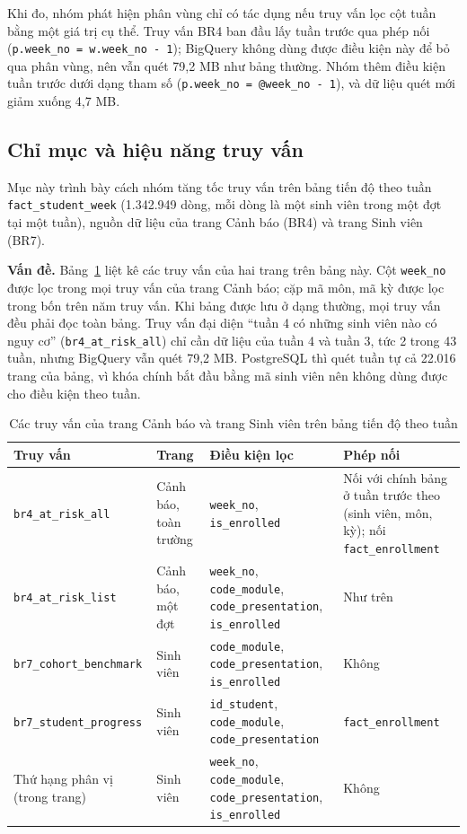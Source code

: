 Khi đo, nhóm phát hiện phân vùng chỉ có tác dụng nếu truy vấn lọc cột tuần bằng một giá trị cụ
thể. Truy vấn BR4 ban đầu lấy tuần trước qua phép nối (\texttt{p.week\_no = w.week\_no - 1});
BigQuery không dùng được điều kiện này để bỏ qua phân vùng, nên vẫn quét 79,2 MB như bảng thường.
Nhóm thêm điều kiện tuần trước dưới dạng tham số (\texttt{p.week\_no = @week\_no - 1}), và dữ liệu
quét mới giảm xuống 4,7 MB.

\subsection{Chỉ mục và hiệu năng truy vấn}
\label{sec:chi-muc}

Mục này trình bày cách nhóm tăng tốc truy vấn trên bảng tiến độ theo tuần
\texttt{fact\_student\_week} (1.342.949 dòng, mỗi dòng là một sinh viên trong một đợt tại một
tuần), nguồn dữ liệu của trang Cảnh báo (BR4) và trang Sinh viên (BR7).

\textbf{Vấn đề.} Bảng~\ref{tab:truy-van-fsw} liệt kê các truy vấn của hai trang trên bảng này.
Cột \texttt{week\_no} được lọc trong mọi truy vấn của trang Cảnh báo; cặp mã môn, mã kỳ được lọc
trong bốn trên năm truy vấn. Khi bảng được lưu ở dạng thường, mọi truy vấn đều phải đọc toàn
bảng. Truy vấn đại diện ``tuần 4 có những sinh viên nào có nguy cơ'' (\texttt{br4\_at\_risk\_all})
chỉ cần dữ liệu của tuần 4 và tuần 3, tức 2 trong 43 tuần, nhưng BigQuery vẫn quét 79,2 MB.
PostgreSQL thì quét tuần tự cả 22.016 trang của bảng, vì khóa chính bắt đầu bằng mã sinh viên
nên không dùng được cho điều kiện theo tuần.

\newpage

\begin{table}[htbp]
\centering
\small
\begin{tabularx}{\textwidth}{|p{3.4cm}|p{2.4cm}|X|X|}
\hline
\textbf{Truy vấn} & \textbf{Trang} & \textbf{Điều kiện lọc} & \textbf{Phép nối} \\ \hline
\texttt{br4\_at\_risk\_all} & Cảnh báo, toàn trường & \texttt{week\_no}, \texttt{is\_enrolled} & Nối với chính bảng ở tuần trước theo (sinh viên, môn, kỳ); nối \texttt{fact\_enrollment} \\ \hline
\texttt{br4\_at\_risk\_list} & Cảnh báo, một đợt & \texttt{week\_no}, \texttt{code\_module}, \texttt{code\_presentation}, \texttt{is\_enrolled} & Như trên \\ \hline
\texttt{br7\_cohort\_benchmark} & Sinh viên & \texttt{code\_module}, \texttt{code\_presentation}, \texttt{is\_enrolled} & Không \\ \hline
\texttt{br7\_student\_progress} & Sinh viên & \texttt{id\_student}, \texttt{code\_module}, \texttt{code\_presentation} & \texttt{fact\_enrollment} \\ \hline
Thứ hạng phân vị (trong trang) & Sinh viên & \texttt{week\_no}, \texttt{code\_module}, \texttt{code\_presentation}, \texttt{is\_enrolled} & Không \\ \hline
\end{tabularx}
\caption{Các truy vấn của trang Cảnh báo và trang Sinh viên trên bảng tiến độ theo tuần}
\label{tab:truy-van-fsw}
\end{table}

